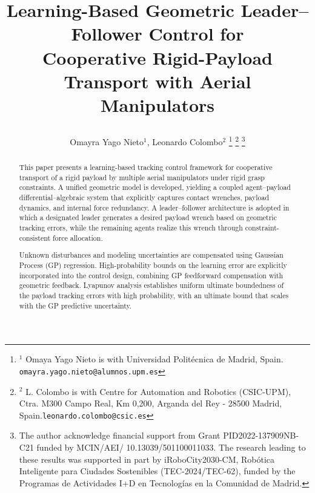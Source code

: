 \documentclass[letterpaper, 10 pt, conference]{ieeeconf}  %
\newcommand{\0}{\matr{0}}
\begin{document}
\title{Learning-Based Geometric Leader–Follower Control for\\ Cooperative Rigid-Payload Transport with Aerial Manipulators

}
\author{
    Omayra Yago Nieto$^1$, Leonardo Colombo$^2$
   \thanks{$^1$ Omaya Yago Nieto is with Universidad Politécnica de Madrid, Spain. {\tt\small omayra.yago.nieto@alumnos.upm.es}}
    \thanks{$^2$ L. Colombo is with Centre for Automation and Robotics (CSIC-UPM), Ctra. M300 Campo Real, Km 0,200, Arganda
del Rey - 28500 Madrid, Spain.{\tt\small leonardo.colombo@csic.es}}
\thanks{The author acknowledge financial support from Grant PID2022-137909NB-C21 funded by MCIN/AEI/ 10.13039/501100011033. The research leading to these results was supported in part by iRoboCity2030-CM, Robótica Inteligente para Ciudades Sostenibles (TEC-2024/TEC-62), funded by the Programas de Actividades I+D en Tecnologías en la Comunidad de Madrid.}
}


\maketitle
\thispagestyle{empty}
\pagestyle{empty}


\begin{abstract}
This paper presents a learning-based tracking control framework for cooperative
transport of a rigid payload by multiple aerial manipulators under rigid grasp
constraints. A unified geometric model is developed, yielding a coupled
agent--payload differential--algebraic system that explicitly captures contact
wrenches, payload dynamics, and internal force redundancy. A leader--follower
architecture is adopted in which a designated leader generates a desired payload
wrench based on geometric tracking errors, while the remaining agents
realize this wrench through constraint-consistent force allocation.

Unknown disturbances and modeling uncertainties are compensated using Gaussian
Process (GP) regression. High-probability bounds on the learning error are
explicitly incorporated into the control design, combining GP feedforward
compensation with geometric feedback. Lyapunov analysis establishes uniform
ultimate boundedness of the payload tracking errors with high probability, with
an ultimate bound that scales with the GP predictive uncertainty.
\end{abstract}
\end{document}
